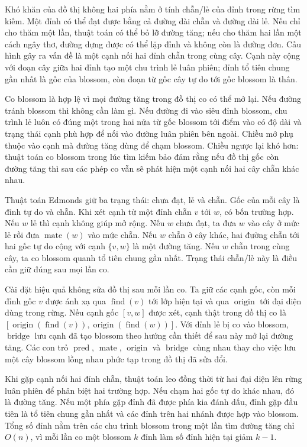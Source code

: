 \documentclass[11pt]{article}
\begin{document}
Khó khăn của đồ thị không hai phía nằm ở tính chẵn/lẻ của đỉnh trong rừng tìm
kiếm. Một đỉnh có thể đạt được bằng cả đường dài chẵn và đường dài lẻ. Nếu chỉ
cho thăm một lần, thuật toán có thể bỏ lỡ đường tăng; nếu cho thăm hai lần một
cách ngây thơ, đường dựng được có thể lặp đỉnh và không còn là đường đơn. Cấu
hình gây ra vấn đề là một cạnh nối hai đỉnh chẵn trong cùng cây. Cạnh này cộng với
đoạn cây giữa hai đỉnh tạo một chu trình lẻ luân phiên; đỉnh tổ tiên chung gần
nhất là gốc của blossom, còn đoạn từ gốc cây tự do tới gốc blossom là thân.

Co blossom là hợp lệ vì mọi đường tăng trong đồ thị co có thể mở lại. Nếu đường
tránh blossom thì không cần làm gì. Nếu đường đi vào siêu đỉnh blossom, chu trình
lẻ luôn có đúng một trong hai nửa từ gốc blossom tới điểm vào có độ dài và trạng
thái cạnh phù hợp để nối vào đường luân phiên bên ngoài. Chiều mở phụ thuộc vào
cạnh mà đường tăng dùng để chạm blossom. Chiều ngược lại khó hơn: thuật toán
co blossom trong lúc tìm kiếm bảo đảm rằng nếu đồ thị gốc còn đường tăng thì sau
các phép co vẫn sẽ phát hiện một cạnh nối hai cây chẵn khác nhau.

Thuật toán Edmonds giữ ba trạng thái: chưa đạt, lẻ và chẵn. Gốc của mỗi cây là
đỉnh tự do và chẵn. Khi xét cạnh từ một đỉnh chẵn \(v\) tới \(w\), có bốn trường
hợp. Nếu \(w\) lẻ thì cạnh không giúp mở rộng. Nếu \(w\) chưa đạt, ta đưa \(w\)
vào cây ở mức lẻ rồi đưa \(\operatorname{mate}(w)\) vào mức chẵn. Nếu \(w\) chẵn
ở cây khác, hai đường chẵn tới hai gốc tự do cộng với cạnh \(\{v,w\}\) là một
đường tăng. Nếu \(w\) chẵn trong cùng cây, ta co blossom quanh tổ tiên chung gần
nhất. Trạng thái chẵn/lẻ này là điều cần giữ đúng sau mọi lần co.

Cài đặt hiệu quả không sửa đồ thị sau mỗi lần co. Ta giữ các cạnh gốc, còn mỗi
đỉnh gốc \(v\) được ánh xạ qua \(\operatorname{find}(v)\) tới lớp hiện tại và qua
\(\operatorname{origin}\) tới đại diện dùng trong rừng. Nếu cạnh gốc \([v,w]\)
được xét, cạnh thật trong đồ thị co là
\([\operatorname{origin}(\operatorname{find}(v)),
  \operatorname{origin}(\operatorname{find}(w))]\).
Với đỉnh lẻ bị co vào blossom, \(\operatorname{bridge}\) lưu cạnh đã tạo blossom
theo hướng cần thiết để sau này mở lại đường tăng. Các con trỏ
\(\operatorname{pred}\), \(\operatorname{mate}\), \(\operatorname{origin}\) và
\(\operatorname{bridge}\) cùng nhau thay cho việc lưu một cây blossom lồng nhau
phức tạp trong đồ thị đã sửa đổi.

Khi gặp cạnh nối hai đỉnh chẵn, thuật toán leo đồng thời từ hai đại diện lên rừng
luân phiên để phân biệt hai trường hợp. Nếu chạm hai gốc tự do khác nhau, đó là
đường tăng. Nếu một phía gặp đỉnh đã được phía kia đánh dấu, đỉnh gặp đầu tiên là
tổ tiên chung gần nhất và các đỉnh trên hai nhánh được hợp vào blossom. Tổng số
đỉnh nằm trên các chu trình blossom trong một lần tìm đường tăng chỉ \(O(n)\), vì
mỗi lần co một blossom \(k\) đỉnh làm số đỉnh hiện tại giảm \(k-1\).
\end{document}

